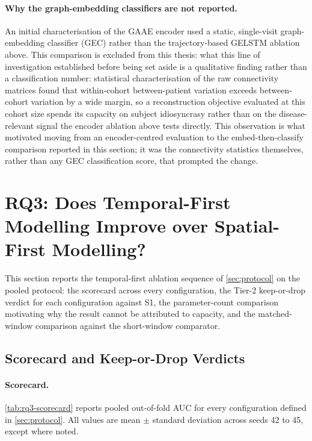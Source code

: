 \paragraph{Why the graph-embedding classifiers are not reported.} An initial characterisation
of the \ac{GAAE} encoder used a static, single-visit graph-embedding classifier
(\ac{GEC}) rather than the trajectory-based \ac{GELSTM} ablation above. This comparison is
excluded from this thesis: what this line of investigation established
before being set aside is a qualitative finding rather than a classification number:
statistical characterisation of the raw connectivity matrices found that within-cohort
between-patient variation exceeds between-cohort variation by a wide margin, so a
reconstruction objective evaluated at this cohort size spends its capacity on subject
idiosyncrasy rather than on the disease-relevant signal the encoder ablation above tests
directly. This observation is what motivated moving from an encoder-centred evaluation to the
embed-then-classify comparison reported in this section; it was the connectivity statistics
themselves, rather than any \ac{GEC} classification score, that prompted the change.

\section{RQ3: Does Temporal-First Modelling Improve over Spatial-First Modelling?}\label{sec:rq3}

This section reports the temporal-first ablation sequence of \autoref{sec:protocol} on the
pooled protocol: the scorecard across every configuration, the Tier-2 keep-or-drop verdict for each
configuration against S1, the parameter-count comparison motivating why the result cannot be
attributed to capacity, and the matched-window comparison against the short-window comparator.

\subsection{Scorecard and Keep-or-Drop Verdicts}\label{sec:rq3-scorecard-verdicts}

\paragraph{Scorecard.} \autoref{tab:rq3-scorecard} reports pooled out-of-fold \ac{AUC} for
every configuration defined in \autoref{sec:protocol}. All values are mean $\pm$ standard deviation
across seeds 42 to 45, except where noted.


